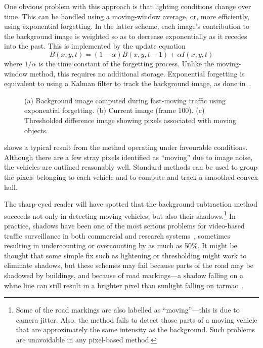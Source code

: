 One obvious problem with this approach is that lighting conditions
change over time. This can be handled using a moving-window average,
or, more efficiently, using exponential forgetting. In the latter
scheme, each image's contribution to the background image is weighted
so as to decrease exponentially as it recedes into the past. This is
implemented by the update equation
\begin{equation}
B(x,y,t) = (1-\alpha)B(x,y,t-1) + \alpha I(x,y,t)
\label{forgetting-equation}
\end{equation}
where $1/\alpha$ is the time constant of the forgetting process.
Unlike the moving-window method, this requires no additional storage.
Exponential forgetting is equivalent to using a Kalman filter to track
the background image, as done in~\cite{Koller+al:1994}.




\begin{figure}[t]
\centering
{}
\caption{(a) Background image computed during fast-moving traffic
using exponential forgetting. (b) Current image (frame 100). (c) Thresholded
difference image showing pixels associated with moving objects.}
\label{fast-traffic-figure}
\end{figure}

 shows a typical result from the method
operating under favourable conditions. Although there are a few stray
pixels identified as ``moving'' due to image noise, the vehicles are
outlined reasonably well. Standard methods can be used to group the
pixels belonging to each vehicle and to compute and track a smoothed
convex hull.

The sharp-eyed reader will have spotted that the background
subtraction method succeeds not only in detecting moving vehicles, but
also their shadows.\footnote{Some of the road markings are also
labelled as ``moving''---this is due to camera jitter.
Also, the method fails to detect those parts of a moving vehicle that
are approximately the same intensity as the background.
Such problems are unavoidable in any pixel-based method.}
In practice, shadows have been one of the most
serious problems for video-based traffic surveillance in both
commercial and research systems~\cite{Michalopoulos:1991}, sometimes
resulting in undercounting or overcounting by as much as 50\%.  It
might be thought that some simple fix such as lightening or
thresholding might work to eliminate shadows, but these schemes may fail
because parts of the road may be shadowed by buildings, and because of
road markings---a shadow falling on a white line can still result in a
brighter pixel than sunlight falling on tarmac~\cite{Kilger:1992}.

